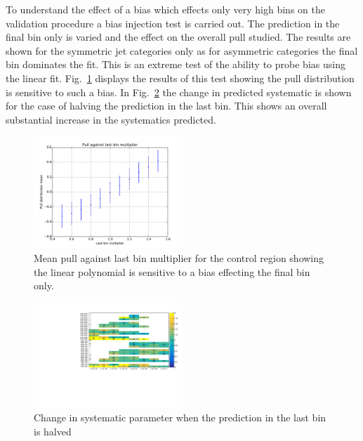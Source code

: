 \label{sec:biasInj}
To understand the effect of a bias which effects only very high 
\mht bins on the validation procedure a bias injection test is carried out.
The prediction in the final bin only is varied and the effect on the 
overall pull studied. The results are shown for the symmetric jet categories only
as for asymmetric categories the final \mht bin dominates the fit. This is 
an extreme test of the ability to probe bias using the linear fit. 
Fig.~\ref{fig:biasInjTest} displays the results of this test showing
the pull distribution is sensitive to such a bias. In Fig.~\ref{fig:biasSyst} the 
change in predicted systematic is shown for the case of halving the prediction in the last bin. 
This shows an overall substantial increase in the systematics predicted.

\begin{figure}[]
  \centering
  \includegraphics[width=0.5\textwidth]{figures/template/biasInjTest.pdf}
  \caption{\label{fig:biasInjTest} Mean pull against last bin multiplier for 
  the \mj control region showing the linear polynomial is sensitive to a bias effecting the final bin only.}
\end{figure}

\begin{figure}[]
  \centering
  \includegraphics[width=0.5\textwidth]{figures/template/biasSystTest.pdf}
  \caption{\label{fig:biasSyst} Change in systematic parameter when the prediction in the last bin
  is halved}
\end{figure}

